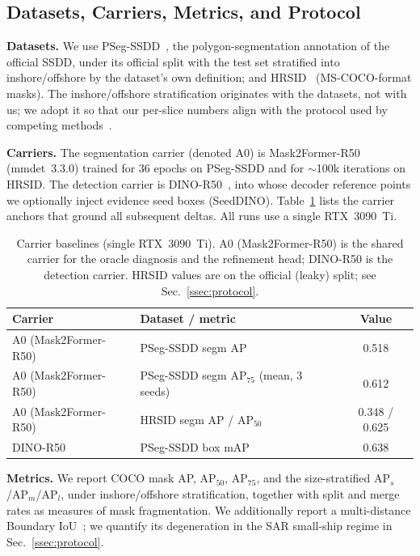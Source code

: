 \subsection{Datasets, Carriers, Metrics, and Protocol}
\label{ssec:setup}
\textbf{Datasets.} We use PSeg-SSDD~\cite{zhang2021ssdd}, the polygon-segmentation annotation of the official SSDD, under its official split with the test set stratified into inshore/offshore by the dataset's own definition; and HRSID~\cite{wei2020hrsid} (MS-COCO-format masks). The inshore/offshore stratification originates with the datasets, not with us; we adopt it so that our per-slice numbers align with the protocol used by competing methods~\cite{gao2025o2former,xu2025diffsarshipinst}.

\textbf{Carriers.} The segmentation carrier (denoted A0) is Mask2Former-R50~\cite{cheng2022mask2former} (mmdet~3.3.0) trained for 36 epochs on PSeg-SSDD and for $\sim$100k iterations on HRSID. The detection carrier is DINO-R50~\cite{zhang2023dino}, into whose decoder reference points we optionally inject evidence seed boxes (SeedDINO). Table~\ref{tab:carriers} lists the carrier anchors that ground all subsequent deltas. All runs use a single RTX~3090~Ti.

\begin{table}[t]
\centering
\caption{Carrier baselines (single RTX~3090~Ti). A0 (Mask2Former-R50) is the shared carrier for the oracle diagnosis and the refinement head; DINO-R50 is the detection carrier. HRSID values are on the official (leaky) split; see Sec.~\ref{ssec:protocol}.}
\label{tab:carriers}
\begin{tabular}{@{}llc@{}}
\toprule
Carrier & Dataset / metric & Value \\
\midrule
A0 (Mask2Former-R50) & PSeg-SSDD segm AP & 0.518 \\
A0 (Mask2Former-R50) & PSeg-SSDD segm AP$_{75}$ (mean, 3 seeds) & 0.612 \\
A0 (Mask2Former-R50) & HRSID segm AP / AP$_{50}$ & 0.348 / 0.625 \\
DINO-R50             & PSeg-SSDD box mAP & 0.638 \\
\bottomrule
\end{tabular}
\end{table}

\textbf{Metrics.} We report COCO mask AP, AP$_{50}$, AP$_{75}$, and the size-stratified AP$_{s}$/AP$_{m}$/AP$_{l}$, under inshore/offshore stratification, together with split and merge rates as measures of mask fragmentation. We additionally report a multi-distance Boundary IoU~\cite{cheng2021boundary}; we quantify its degeneration in the SAR small-ship regime in Sec.~\ref{ssec:protocol}.

